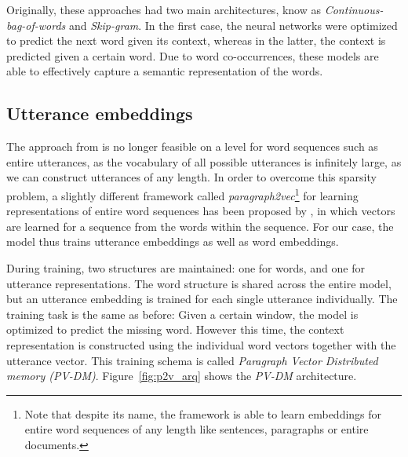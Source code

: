 Originally, these approaches had two main architectures, know as \emph{Continuous-bag-of-words} and \emph{Skip-gram}. In the first case, the neural networks were optimized to predict the next word given its context, whereas in the latter, the context is predicted given a certain word.
Due to word co-occurrences, these models are able to effectively capture a semantic representation of the words. 

\subsection{Utterance embeddings} 
The approach from  is no longer feasible on a level for word sequences such as entire utterances, as the vocabulary of all possible utterances  is infinitely large, as we can construct utterances of any length.
In order to overcome this sparsity problem, a slightly different framework called \emph{paragraph2vec}\footnote{Note that despite its name, the framework is able to learn embeddings for entire word sequences of any length like sentences, paragraphs or entire documents.} for learning representations of entire word sequences has been proposed by , in which vectors are learned for a sequence from the words within the sequence.
For our case, the model thus trains utterance embeddings as well as word embeddings.

During training, two structures are maintained: one for words, and one for utterance representations.
The word structure is shared across the entire model, but an utterance embedding is trained for each single utterance individually.
The training task is the same as before: Given a certain window, the model is optimized to predict the missing word.
However this time, the context representation is constructed using the individual word vectors together with the utterance vector.
This training schema is called \emph{Paragraph Vector Distributed memory (PV-DM)}.  Figure~\ref{fig:p2v_arq} shows the \emph{PV-DM} architecture.



